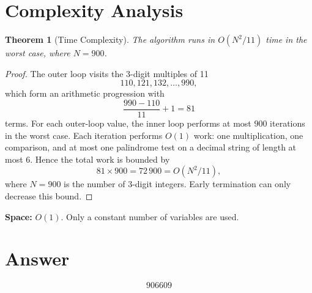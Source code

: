 \documentclass[11pt]{article}
\newtheorem{theorem}{Theorem}
\begin{document}
\section{Complexity Analysis}

\begin{theorem}[Time Complexity]
The algorithm runs in $O(N^2/11)$ time in the worst case, where $N = 900$.
\end{theorem}

\begin{proof}
The outer loop visits the 3-digit multiples of 11
\[
110, 121, 132, \ldots, 990,
\]
which form an arithmetic progression with
\[
\frac{990 - 110}{11} + 1 = 81
\]
terms. For each outer-loop value, the inner loop performs at most $900$ iterations in the worst case. Each iteration performs $O(1)$ work: one multiplication, one comparison, and at most one palindrome test on a decimal string of length at most $6$. Hence the total work is bounded by
\[
81 \times 900 = 72\,900 = O(N^2/11),
\]
where $N = 900$ is the number of 3-digit integers. Early termination can only decrease this bound.
\end{proof}

\textbf{Space:} $O(1)$. Only a constant number of variables are used.

\section{Answer}

\[
\boxed{906609}
\]
\end{document}
